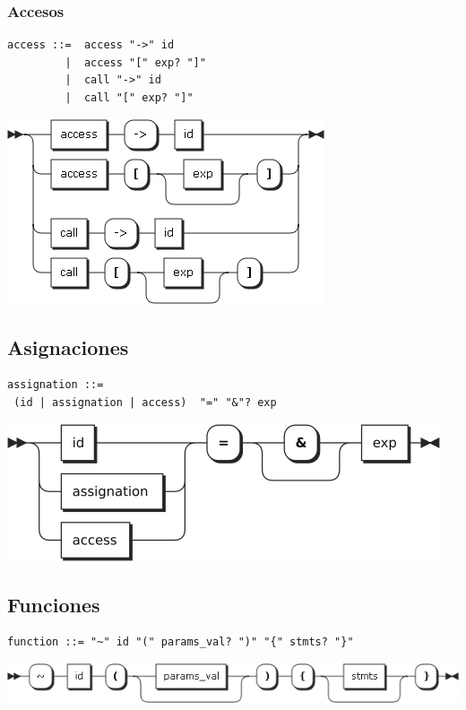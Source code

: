 \subsubsection{Accesos}
\begin{multicols}{2}
\begin{lstlisting}[style=nonumbers, basicstyle=\tiny]      
access ::=  access "->" id
         |  access "[" exp? "]"
         |  call "->" id
         |  call "[" exp? "]"
\end{lstlisting}  
\columnbreak	
\begin{center}
\includegraphics[scale=0.4]{diagram/access.png} \\
\end{center}
\end{multicols}

\subsection{Asignaciones}
\begin{multicols}{2}
\begin{lstlisting}[style=nonumbers, basicstyle=\tiny]      
assignation ::=   
 (id | assignation | access)  "=" "&"? exp
\end{lstlisting}  
\columnbreak	
\begin{center}
\includegraphics[scale=0.5]{diagram/assignation.png} \\
\end{center}
\end{multicols}
\subsection{Funciones}
\begin{lstlisting}[style=nonumbers]
function ::= "~" id "(" params_val? ")" "{" stmts? "}"
\end{lstlisting}
\begin{center}
\includegraphics[scale=0.5]{diagram/function.png} \\
\end{center}

